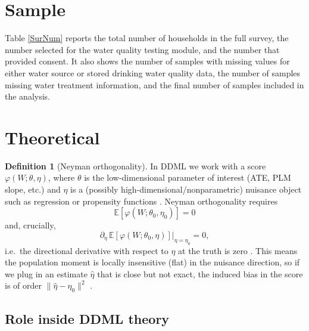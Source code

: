 \documentclass [11pt]{article}
\theoremstyle{plain}
\theoremstyle{definition}
\newtheorem{definition}[theorem]{Definition}
\theoremstyle{remark}
\newcommand{\1}{\bm{1}}
\newcommand{\E}{\mathbb{E}}
\begin{document}
\clearpage
\doublespacing  
\begin{appendices}
\section{Sample}\label{Sample0}\setcounter{figure}{0}\setcounter{table}{0}
Table \ref{SurNum} reports the total number of households in the full survey, the number selected for the water quality testing module, and the number that provided consent. It also shows the number of samples with missing values for either water source or stored drinking water quality data, the number of samples missing water treatment information, and the final number of samples included in the analysis.

{\renewcommand\normalsize{\footnotesize}\normalsize\singlespacing  
}


\clearpage
\section{Theoretical}\label{DDMLTheo}\setcounter{figure}{0}\setcounter{table}{0}

\begin{definition}[Neyman orthogonality]
In DDML we work with a score $\varphi(W; \theta, \eta)$, where $\theta$ is the low-dimensional parameter of interest (ATE, PLM slope, etc.) and $\eta$ is a (possibly high-dimensional/nonparametric) nuisance object such as regression or propensity functions \citep[Section 2]{chernozhukov2018dml}. Neyman orthogonality requires
\[
\E[\varphi(W; \theta_0, \eta_0)] = 0
\]
and, crucially,
\[
\partial_\eta \,\E[\varphi(W; \theta_0, \eta)]
\big\vert_{\eta = \eta_0} = 0,
\]
i.e.\ the directional derivative with respect to $\eta$ at the truth is zero \citep[Def.~1]{doubleml2022}. This means the population moment is locally insensitive (flat) in the nuisance direction, so if we plug in an estimate $\hat{\eta}$ that is close but not exact, the induced bias in the score is of order $\|\hat{\eta} - \eta_0\|^2$ \citep[Sec.~2.1]{chernozhukov2018dml}.
\end{definition}

\subsection*{Role inside DDML theory}


\end{appendices}
\end{document}
